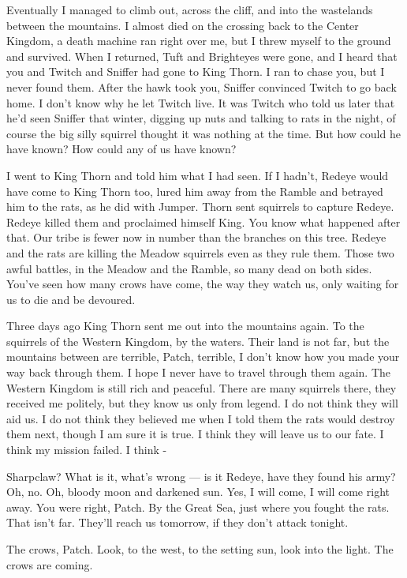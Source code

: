 \documentclass[12pt]{book}
\begin{document}
Eventually I managed to climb out, across the cliff, and into the
wastelands between the mountains. I almost died on the crossing back
to the Center Kingdom, a death machine ran right over me, but I threw
myself to the ground and survived. When I returned, Tuft and
Brighteyes were gone, and I heard that you and Twitch and Sniffer had
gone to King Thorn. I ran to chase you, but I never found them. After
the hawk took you, Sniffer convinced Twitch to go back home. I don't
know why he let Twitch live. It was Twitch who told us later that he'd
seen Sniffer that winter, digging up nuts and talking to rats in the
night, of course the big silly squirrel thought it was nothing at the
time. But how could he have known? How could any of us have known?

I went to King Thorn and told him what I had seen. If I hadn't, Redeye
would have come to King Thorn too, lured him away from the Ramble and
betrayed him to the rats, as he did with Jumper. Thorn sent squirrels
to capture Redeye. Redeye killed them and proclaimed himself King. You
know what happened after that. Our tribe is fewer now in number than
the branches on this tree. Redeye and the rats are killing the Meadow
squirrels even as they rule them. Those two awful battles, in the
Meadow and the Ramble, so many dead on both sides. You've seen how
many crows have come, the way they watch us, only waiting for us to
die and be devoured.

Three days ago King Thorn sent me out into the mountains again. To the
squirrels of the Western Kingdom, by the waters. Their land is not
far, but the mountains between are terrible, Patch, terrible, I don't
know how you made your way back through them. I hope I never have to
travel through them again. The Western Kingdom is still rich and
peaceful. There are many squirrels there, they received me politely,
but they know us only from legend. I do not think they will aid us. I
do not think they believed me when I told them the rats would destroy
them next, though I am sure it is true. I think they will leave us to
our fate. I think my mission failed. I think -

Sharpclaw? What is it, what's wrong --- is it Redeye, have they found
his army? Oh, no. Oh, bloody moon and darkened sun. Yes, I will come,
I will come right away. You were right, Patch. By the Great Sea, just
where you fought the rats. That isn't far. They'll reach us tomorrow,
if they don't attack tonight.

The crows, Patch. Look, to the west, to the setting sun, look into the
light. The crows are coming.
\end{document}
